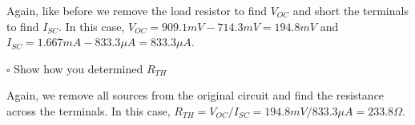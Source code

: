 \documentclass[12pt]{article}
\begin{document}
Again, like before we remove the load resistor to find $V_{OC}$ and short the terminals to find $I_{SC}$. In this case, $V_{OC} = 909.1mV - 714.3mV = 194.8mV$ and $I_{SC} = 1.667mA - 833.3 \mu A = 833.3 \mu A$.


$\square$ Show how you determined $R_{TH}$

Again, we remove all sources from the original circuit and find the resistance across the terminals. In this case, $R_{TH} = V_{OC}/I_{SC} = 194.8mV/833.3 \mu A = 233.8 \Omega$.
\end{document}
